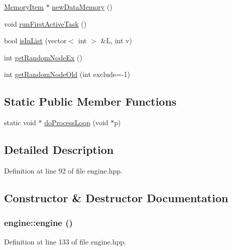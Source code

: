 \begin{DoxyCompactItemize}
\item 
\hyperlink{struct_memory_item}{MemoryItem} $\ast$ \hyperlink{classengine_a99ae6156ee65044d03d61a3776ef2f99}{newDataMemory} ()
\item 
void \hyperlink{classengine_ad5b326de03b791ffb0846bbcc18d4252}{runFirstActiveTask} ()
\item 
bool \hyperlink{classengine_a8ddaa23b1b3357279a2e932d0603d547}{isInList} (vector$<$ int $>$ \&L, int v)
\item 
int \hyperlink{classengine_aa8a57f2a78fcc700597dec842cf537df}{getRandomNodeEx} ()
\item 
int \hyperlink{classengine_a2156b4ae876cbd9345642b9cd580cf1f}{getRandomNodeOld} (int exclude=-\/1)
\end{DoxyCompactItemize}
\subsection*{Static Public Member Functions}
\begin{DoxyCompactItemize}
\item 
static void $\ast$ \hyperlink{classengine_a4e7f59155ec8ac715c490a7006489d76}{doProcessLoop} (void $\ast$p)
\end{DoxyCompactItemize}


\subsection{Detailed Description}


Definition at line 92 of file engine.hpp.

\subsection{Constructor \& Destructor Documentation}
\hypertarget{classengine_aaffbfa4e20b4b627f2336eb6b40db348}{
\subsubsection[{engine}]{\setlength{\rightskip}{0pt plus 5cm}engine::engine ()}}
\label{classengine_aaffbfa4e20b4b627f2336eb6b40db348}


Definition at line 133 of file engine.hpp.

